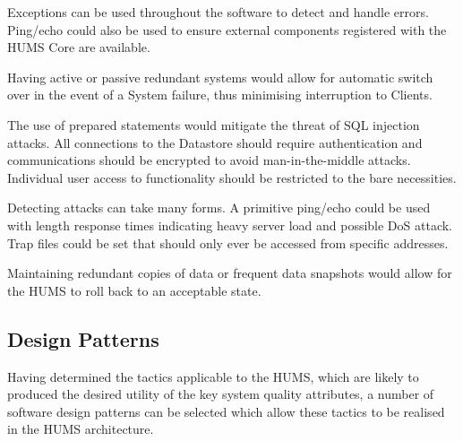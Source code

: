 \documentclass[10pt,a4paper]{article}
\begin{document}
\begin{description}
\begin{description}[noitemsep]
	\item[Fault Detection] Exceptions can be used throughout the software to detect and handle errors. Ping/echo could also be used to ensure external components registered with the HUMS Core are available.
	\item[Fault Recovery] Having active or passive redundant systems would allow for automatic switch over in the event of a System failure, thus minimising interruption to Clients.
	\end{description}
\item[Security] \hfill
	\begin{description}[noitemsep]
	\item[Resisting Attacks] The use of prepared statements would mitigate the threat of SQL injection attacks. All connections to the Datastore should require authentication and communications should be encrypted to avoid man-in-the-middle attacks. Individual user access to functionality should be restricted to the bare necessities. 
	\item[Detecting Attacks] Detecting attacks can take many forms. A primitive ping/echo could be used with length response times indicating heavy server load and possible DoS attack. Trap files could be set that should only ever be accessed from specific addresses.
	\item[Recovering From Attacks] Maintaining redundant copies of data or frequent data snapshots would allow for the HUMS to roll back to an acceptable state.
	\end{description}
\end{description}

\subsection{Design Patterns}
Having determined the tactics applicable to the HUMS, which are likely to produced the desired utility of the key system quality attributes, a number of software design patterns can be selected which allow these tactics to be realised in the HUMS architecture.
\end{document}
